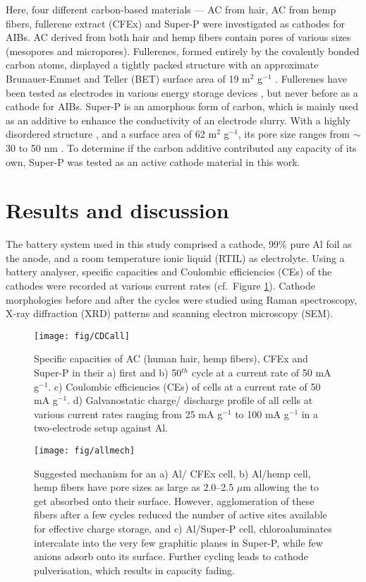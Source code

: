 \documentclass{article}
\begin{document}
Here, four different carbon-based materials --- AC from hair, AC from hemp fibers, fullerene extract (CFEx) and Super-P were investigated as cathodes for AIBs. AC derived from both hair and hemp fibers contain pores of various sizes (mesopores and micropores). Fullerenes, formed entirely by the covalently bonded carbon atoms, displayed a tightly packed structure with an approximate Brunauer-Emmet and Teller (BET) surface area of 19 m$^2$ g$^{-1}$ \cite{yuan_coupling_2016}. Fullerenes have been tested as electrodes in various energy storage devices \cite{chabre_electrochemical_1992, sood_electrochemical_2018, zhang_fullerenes_2014}, but never before as a cathode for AIBs. Super-P is an amorphous form of carbon, which is mainly used as an additive to enhance the conductivity of an electrode slurry. With a highly disordered structure \cite{see_reversible_2017}, and a surface area of 62 m$^2$ g$^{-1}$, its pore size ranges from $\sim$30 to 50 nm \cite{younesi_analysis_2015}. To determine if the carbon additive contributed any capacity of its own, Super-P was tested as an active cathode material in this work. 
\section{Results and discussion}
The battery system used in this study comprised a cathode, 99\% pure Al foil as the anode, and a room temperature ionic liquid (RTIL) as electrolyte. Using a battery analyser, specific capacities and Coulombic efficiencies (CEs) of the cathodes were recorded at various current rates (cf.\ Figure \ref{fig:CDCall}). Cathode morphologies before and after the cycles were studied using Raman spectroscopy, X-ray diffraction (XRD) patterns and scanning electron microscopy (SEM).

\begin{figure}
  \centering
  \texttt{[image: fig/CDCall]}
    \caption{Specific capacities of AC (human hair, hemp fibers), CFEx and Super-P in their a) first and b) 50$^{th}$ cycle at a current rate of 50 mA g$^{-1}$. c) Coulombic efficiencies (CEs) of cells at a current rate of 50 mA g$^{-1}$. d) Galvanostatic charge/ discharge profile of all cells at various current rates ranging from 25 mA g$^{-1}$ to 100 mA g$^{-1}$ in a two-electrode setup against Al.}
  \label{fig:CDCall}
\end{figure}

\begin{figure}
  \centering
  \texttt{[image: fig/allmech]}
    \caption{Suggested mechanism for an a) Al/ CFEx cell, b) Al/hemp cell, hemp fibers have pore sizes as large as 2.0--2.5 $\mu$m allowing the  to get absorbed onto their surface. However, agglomeration of these fibers after a few cycles reduced the number of active sites available for effective charge storage, and c) Al/Super-P cell, chloroaluminates intercalate into the very few graphitic planes in Super-P, while few anions adsorb onto its surface. Further cycling leads to cathode pulverisation, which results in capacity fading.}
  \label{fig:allmech}
\end{figure}
\end{document}
